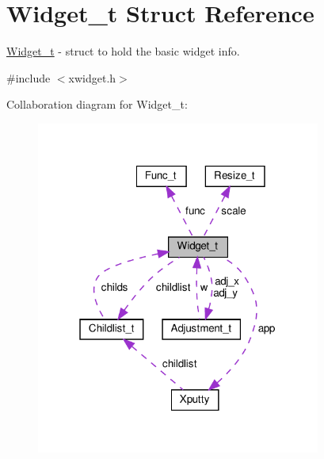 \hypertarget{structWidget__t}{}\section{Widget\+\_\+t Struct Reference}
\label{structWidget__t}


\hyperlink{structWidget__t}{Widget\+\_\+t} -\/ struct to hold the basic widget info.  




{\ttfamily \#include $<$xwidget.\+h$>$}



Collaboration diagram for Widget\+\_\+t\+:
\nopagebreak
\begin{figure}[H]
\begin{center}
\leavevmode
\includegraphics[width=265pt]{structWidget__t__coll__graph}
\end{center}
\end{figure}

